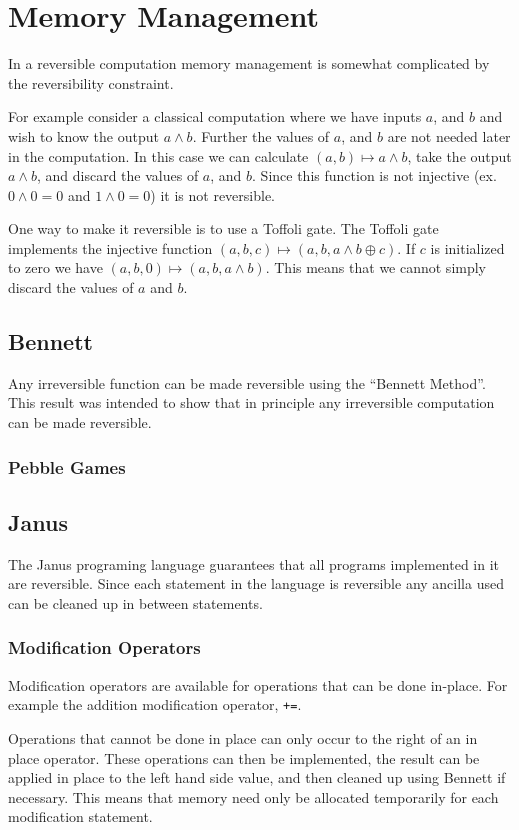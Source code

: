 \chapter{Memory Management}
In a reversible computation memory management is somewhat complicated by the reversibility constraint.

For example consider a classical computation where we have inputs $a$, and $b$ and wish to know the output $a\land b$.
Further the values of $a$, and $b$ are not needed later in the computation.
In this case we can calculate $(a,b) \mapsto a \land b$, take the output $a\land b$, and discard the values of $a$, and $b$.
Since this function is not injective (ex. $0\land 0 = 0$ and $1 \land 0 = 0$) it is not reversible.

One way to make it reversible is to use a Toffoli gate.
The Toffoli gate implements the injective function $(a,b,c) \mapsto (a,b,a\land b \oplus c)$.
If $c$ is initialized to zero we have $(a,b,0) \mapsto (a,b,a\land b)$.
This means that we cannot simply discard the values of $a$ and $b$.

\section{Bennett}
Any irreversible function can be made reversible using the ``Bennett Method''\cite{Bennett:73}.
This result was intended to show that in principle any irreversible computation can be made reversible.

\subsection{Pebble Games}

\section{Janus}
The Janus\cite{YG:2007,LD:1982} programing language guarantees that all programs implemented in it are reversible.
Since each statement in the language is reversible any ancilla used can be cleaned up in between statements.

\subsection{Modification Operators}
Modification operators are available for operations that can be done in-place.
For example the addition modification operator, \verb|+=|.

Operations that cannot be done in place can only occur to the right of an in place operator.
These operations can then be implemented,
the result can be applied in place to the left hand side value,
and then cleaned up using Bennett if necessary.
This means that memory need only be allocated temporarily for each modification statement.

